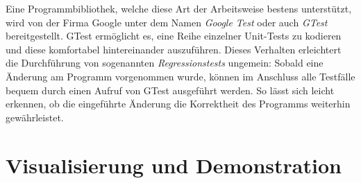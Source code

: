 Eine Programmbibliothek, welche diese Art der Arbeitsweise bestens unterst\"utzt, wird von der Firma Google unter dem Namen
\textit{Google Test}
oder auch \textit{GTest} bereitgestellt. GTest erm\"oglicht es, eine Reihe einzelner Unit-Tests zu kodieren und diese komfortabel
hintereinander auszuf\"uhren. Dieses Verhalten erleichtert die Durchf\"uhrung von sogenannten \textit{Regressionstests} ungemein:
Sobald eine \"Anderung am Programm vorgenommen wurde, k\"onnen im Anschluss alle Testf\"alle bequem durch einen Aufruf von GTest
ausgef\"uhrt werden. So l\"asst sich leicht erkennen, ob die eingef\"uhrte  \"Anderung die Korrektheit des Programms weiterhin
gew\"ahrleistet.

\section{Visualisierung und Demonstration}
